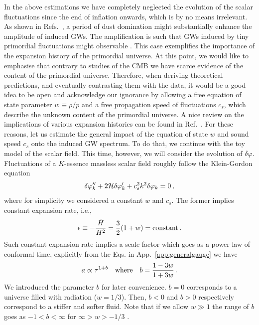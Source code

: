 \documentclass[a4paper,11pt]{article}
\numberwithin{equation}{section}
\begin{document}
In the above estimations we have completely neglected the evolution of the scalar fluctuations since the end of inflation onwards, which is by no means irrelevant. As shown in Refs.~\cite{Assadullahi:2009nf,Alabidi:2013lya,Inomata:2019ivs,Inomata:2019zqy}, a period of dust domination might substantially enhance the amplitude of induced GWs. The amplification is such that GWs induced by tiny primordial fluctuations might observable \cite{Alabidi:2013lya,Inomata:2019ivs}. This case exemplifies the importance of the expansion history of the primordial universe. At this point, we would like to emphasise that contrary to studies of the CMB we have scarce evidence of the content of the primordial universe. Therefore, when deriving theoretical predictions, and eventually contrasting them with the data, it would be a good idea to be open and acknowledge our ignorance by allowing a free equation of state parameter $w\equiv \rho/p$ and a free propagation speed of fluctuations $c_s$, which describe the unknown content of the primordial universe. A nice review on the implications of various expansion histories can be found in Ref.~\cite{Allahverdi:2020bys}. For these reasons, let us estimate the general impact of the equation of state $w$ and sound speed $c_s$ onto the induced GW spectrum. To do that, we continue with the toy model of the scalar field. This time, however, we will consider the evolution of $\delta\varphi$. Fluctuations of a $K$-essence massless scalar field roughly follow the Klein-Gordon equation
\begin{equation}\label{eq:deltaphi}
\delta\varphi_k''+2{\cal H}  \delta\varphi_k'+c_s^2k^2\delta\varphi_k=0\,,
\end{equation}
where for simplicity we considered a constant $w$ and $c_s$. The former implies constant expansion rate, i.e.,
\begin{equation}\label{eq:epsilon}
\epsilon\equiv-\frac{\dot H}{H^2}=\frac{3}{2}(1+w)={\rm constant}\,.
\end{equation}
Such constant expansion rate implies a scale factor which goes as a power-law of conformal time, explicitly from the Eqs. in App.~\ref{app:generalgauge} we have
\begin{equation}\label{eq:b}
a\propto\tau^{1+b}\quad{\rm where}\quad b=\frac{1-3w}{1+3w}\,.
\end{equation}
We introduced the parameter $b$ for later convenience. $b=0$ corresponds to a universe filled with radiation ($w=1/3$). Then, $b<0$ and $b>0$ respectively correspond to a stiffer and softer fluid. Note that if we allow $w\gg1$ the range of $b$ goes as $-1<b<\infty$ for $\infty>w>-1/3$
.
\end{document}

